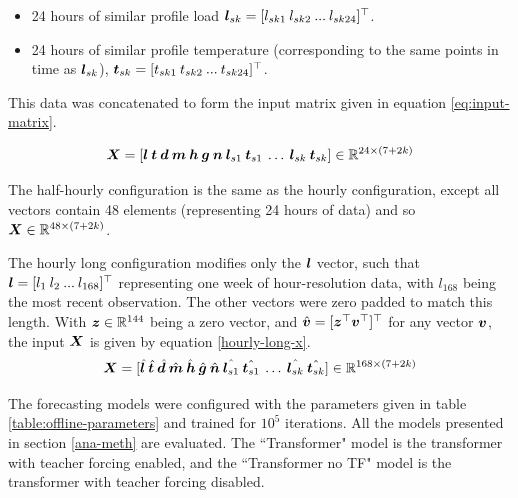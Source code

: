 \begin{itemize}
	\item 24 hours of similar profile load ${\bm{l}}_{sk} = [ l_{sk1} \: l_{sk2} \: ... \: l_{sk24}]^\top$.
	\item 24 hours of similar profile temperature (corresponding to the same points in time as ${\bm{l}}_{sk}$), ${\bm{t}}_{sk} = [ t_{sk1} \: t_{sk2} \: ...  \: t_{sk24}]^\top$.
\end{itemize}

This data was concatenated to form the input matrix given in equation \ref{eq:input-matrix}.

\begin{equation} \label{eq:input-matrix}
{\bm{X}} = [ {\bm{l}} \: {\bm{t}} \: {\bm{d}} \: {\bm{m}} \: {\bm{h}} \: {\bm{g}} \: {\bm{n}} \: {\bm{l}}_{s1} \: {\bm{t}}_{s1} \: \ldots \: {\bm{l}}_{sk} \: {\bm{t}}_{sk}] \in \mathbb{R}^{24 \times (7 + 2k)}
\end{equation}

The half-hourly configuration is the same as the hourly configuration, except all vectors contain 48 elements (representing 24 hours of data) and so ${\bm{X}} \in \mathbb{R}^{48 \times (7 + 2k)}$.

The hourly long configuration modifies only the ${\bm{l}}$ vector, such that ${\bm{l}} = [ l_1 \: l_2 \: ...  \: l_{168}]^\top$ representing one week of hour-resolution data, with $l_{168}$ being the most recent observation.
The other vectors were zero padded to match this length.
With ${\bm{z}} \in \mathbb{R}^{144}$ being a zero vector, and $\hat{{\bm{v}}} = [{\bm{z}}^\top {\bm{v}}^\top]^\top$ for any vector ${\bm{v}}$, the input ${\bm{X}}$ is given by equation \ref{hourly-long-x}.
\begin{equation}
\label{hourly-long-x}
{\bm{X}} = [ \hat{{\bm{l}}} \: \hat{{\bm{t}}} \: \hat{{\bm{d}}} \: \hat{{\bm{m}}} \: \hat{{\bm{h}}} \: \hat{{\bm{g}}} \: \hat{{\bm{n}}} \: \hat{{\bm{l}}_{s1}} \: \hat{{\bm{t}}_{s1}} \: \ldots \: \hat{{\bm{l}}_{sk}} \: \hat{{\bm{t}}_{sk}}] \in \mathbb{R}^{168 \times (7 + 2k)}
\end{equation}

The forecasting models were configured with the parameters given in table \ref{table:offline-parameters} and trained for $10^5$ iterations.
All the models presented in section \ref{ana-meth} are evaluated.
The ``Transformer" model is the transformer with teacher forcing enabled, and the ``Transformer no TF" model is the transformer with teacher forcing disabled.

